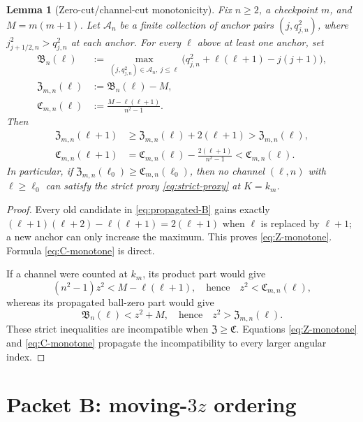 \documentclass[11pt]{article}
\newtheorem{lemma}[theorem]{Lemma}
\theoremstyle{definition}
\theoremstyle{remark}
\newcommand{\frB}{\mathfrak B}
\newcommand{\frC}{\mathfrak C}
\newcommand{\frZ}{\mathfrak Z}
\begin{document}
\begin{lemma}[Zero-cut/channel-cut monotonicity]
\label{lem:cut-monotonicity}
Fix \(n\geq2\), a checkpoint \(m\), and \(M=m(m+1)\).  Let
\(\mathcal A_n\) be a finite collection of anchor pairs
\((j,q_{j,n}^2)\), where
\(j_{j+1/2,n}^2>q_{j,n}^2\) at each anchor.  For every \(\ell\)
above at least one anchor, set
\begin{align}
 \frB_n(\ell)
 &:=\max_{(j,q_{j,n}^2)\in\mathcal A_n,\ j\leq\ell}
 \bigl(q_{j,n}^2+\ell(\ell+1)-j(j+1)\bigr),\label{eq:propagated-B}\\
 \frZ_{m,n}(\ell)&:=\frB_n(\ell)-M,\label{eq:zero-cut}\\
 \frC_{m,n}(\ell)&:=
 \frac{M-\ell(\ell+1)}{n^2-1}.\label{eq:channel-cut}
\end{align}
Then
\begin{align}
 \frZ_{m,n}(\ell+1)&\geq
 \frZ_{m,n}(\ell)+2(\ell+1)>\frZ_{m,n}(\ell),\label{eq:Z-monotone}\\
 \frC_{m,n}(\ell+1)&=
 \frC_{m,n}(\ell)-\frac{2(\ell+1)}{n^2-1}
 <\frC_{m,n}(\ell).\label{eq:C-monotone}
\end{align}
In particular, if
\(\frZ_{m,n}(\ell_0)\geq\frC_{m,n}(\ell_0)\), then no channel
\((\ell,n)\) with \(\ell\geq\ell_0\) can satisfy the strict proxy
\eqref{eq:strict-proxy} at \(K=k_m\).
\end{lemma}

\begin{proof}
Every old candidate in \eqref{eq:propagated-B} gains exactly
\((\ell+1)(\ell+2)-\ell(\ell+1)=2(\ell+1)\) when \(\ell\) is
replaced by \(\ell+1\); a new anchor can only increase the maximum.  This
proves \eqref{eq:Z-monotone}.  Formula \eqref{eq:C-monotone} is direct.

If a channel were counted at \(k_m\), its product part would give
\[
 (n^2-1)z^2<M-\ell(\ell+1),
 \quad\text{hence}\quad z^2<\frC_{m,n}(\ell),
\]
whereas its propagated ball-zero part would give
\[
 \frB_n(\ell)<z^2+M,
 \quad\text{hence}\quad z^2>\frZ_{m,n}(\ell).
\]
These strict inequalities are incompatible when
\(\frZ\geq\frC\).  Equations \eqref{eq:Z-monotone} and
\eqref{eq:C-monotone} propagate the incompatibility to every larger
angular index.
\end{proof}

\section{Packet B: moving-\texorpdfstring{\(3z\)}{3z} ordering}
\label{sec:moving}
\end{document}
